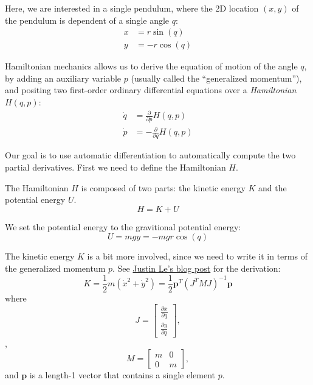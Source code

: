 Here, we are interested in a single pendulum, where the 2D location $(x, y)$ of the pendulum is dependent of a single angle $q$:
\begin{equation}
\begin{aligned}
x &= r \sin(q) \\
y &= -r \cos(q)
\end{aligned}
\end{equation}

Hamiltonian mechanics allows us to derive the equation of motion of the angle $q$, by adding an auxiliary variable $p$ (usually called the ``generalized momentum''), and positing two first-order ordinary differential equations over a \emph{Hamiltonian} $H(q, p)$:
\begin{equation}
\begin{aligned}
\dot{q} &= \frac{\partial}{\partial p} H(q, p) \\
\dot{p} &= -\frac{\partial}{\partial q} H(q, p)
\end{aligned}
\end{equation}

Our goal is to use automatic differentiation to automatically compute the two partial derivatives. First we need to define the Hamiltonian $H$.

The Hamiltonian $H$ is composed of two parts: the kinetic energy $K$ and the potential energy $U$.
\begin{equation}
H = K + U
\end{equation}

We set the potential energy to the gravitional potential energy:
\begin{equation}
U = m g y = -m g r \cos(q)
\end{equation}

The kinetic energy $K$ is a bit more involved, since we need to write it in terms of the generalized momentum $p$. See \href{https://blog.jle.im/entry/hamiltonian-dynamics-in-haskell.html}{Justin Le's blog post} for the derivation:
\begin{equation}
K = \frac{1}{2}m \left(\dot{x}^2 + \dot{y}^2\right) = \frac{1}{2} \mathbf{p}^T \left(J^T M J\right)^{-1} \mathbf{p}
\end{equation}
where
\begin{equation}
J=
\begin{bmatrix}
\frac{\partial x}{\partial q} \\
\frac{\partial y}{\partial q}
\end{bmatrix},
\end{equation}
,
\begin{equation}
M=
\begin{bmatrix}
m & 0 \\
0 & m
\end{bmatrix},
\end{equation}
and $\mathbf{p}$ is a length-1 vector that contains a single element $p$.


